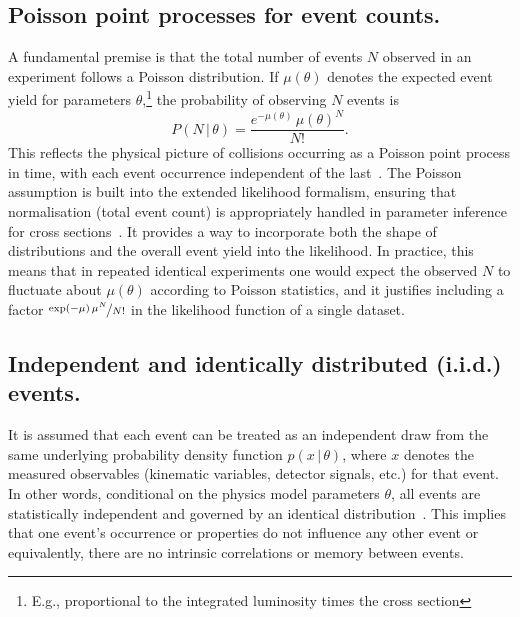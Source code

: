     \subsection{Poisson point processes for event counts.}
        A fundamental premise is that the total number of events $N$ observed in an experiment follows a Poisson distribution.
        If $\mu(\theta)$ denotes the expected event yield for parameters $\theta$,\footnote{E.g., proportional to the integrated luminosity times the cross section} the probability of observing $N$ events is
        \[
            P( N\,|\,\theta) = \frac{e^{-\mu(\theta)}\,\mu(\theta)^N}{N!}.\]
        This reflects the physical picture of collisions occurring as a Poisson point process in time, with each event occurrence independent of the last~\cite{cowan_statistical_1998, Kuusela2015StatisticalQuantification}.
        The Poisson assumption is built into the extended likelihood formalism, ensuring that normalisation (total event count) is appropriately handled in parameter inference for cross sections~\cite{Frate:2017mai, ParticleDataGroup:2018ovx}.
        It provides a way to incorporate both the shape of distributions and the overall event yield into the likelihood.
        In practice, this means that in repeated identical experiments one would expect the observed $N$ to fluctuate about $\mu(\theta)$ according to Poisson statistics, and it justifies including a factor \(\nicefrac{\exp(-\mu)\,\mu^N}{N!}\) in the likelihood function of a single dataset.
    
    \subsection{Independent and identically distributed (i.i.d.) events.}
        It is assumed that each event can be treated as an independent draw from the same underlying probability density function $p(x\,|\,\theta)$, where $x$ denotes the measured observables (kinematic variables, detector signals, etc.) for that event.
        In other words, conditional on the physics model parameters $\theta$, all events are statistically independent and governed by an identical distribution~\cite{Nachman2021EOnce, ParticleDataGroup:2022pth, cowan_statistical_1998, Stakia:2021pvp}.
        This implies that one event’s occurrence or properties do not influence any other event or equivalently, there are no intrinsic correlations or memory between events.
        
